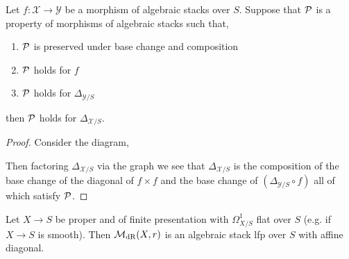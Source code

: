 \documentclass[12pt]{article}
\begin{document}
\renewcommand{\X}{\mathcal{X}}
\newcommand{\Y}{\mathcal{Y}}

\begin{lemma}
Let $f : \X \to \Y$ be a morphism of algebraic stacks over $S$. Suppose that $\mathcal{P}$ is a property of morphisms of algebraic stacks such that,
\begin{enumerate}
\item $\mathcal{P}$ is preserved under base change and composition
\item $\mathcal{P}$ holds for $f$
\item $\mathcal{P}$ holds for $\Delta_{\Y/S}$
\end{enumerate}
then $\mathcal{P}$ holds for $\Delta_{\X/S}$.
\end{lemma}

\begin{proof}
Consider the diagram,
\begin{center}
\end{center}
Then factoring $\Delta_{\X/S}$ via the graph we see that $\Delta_{\X/S}$ is the composition of the base change of the diagonal of $f \times f$ and the base change of $(\Delta_{\Y/S} \circ f)$ all of which satisfy $\mathcal{P}$.
\end{proof}

\begin{prop}
Let $X \to S$ be proper and of finite presentation with $\Omega^1_{X/S}$ flat over $S$ (e.g. if $X \to S$ is smooth). Then $\mathcal{M}_{\mathrm{dR}}(X, r)$ is an algebraic stack lfp over $S$ with affine diagonal.
\end{prop}
\end{document}

